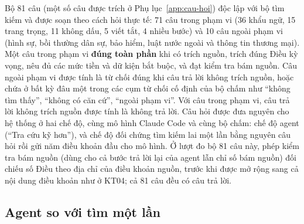 Bộ 81 câu (một số câu được trích ở Phụ lục~\ref{app:cau-hoi}) độc lập với bộ tìm kiếm và được soạn theo cách hỏi thực tế: 71 câu trong phạm vi (36 khẩu ngữ, 15 trang trọng, 11 không dấu, 5 viết tắt, 4 nhiều bước) và 10 câu ngoài phạm vi (hình sự, bồi thường dân sự, bảo hiểm, luật nước ngoài và thông tin thương mại). Một câu trong phạm vi \textbf{đúng toàn phần} khi có trích nguồn, trích đúng Điều kỳ vọng, nêu đủ các mức tiền và dữ kiện bắt buộc, và đạt kiểm tra bám nguồn. Câu ngoài phạm vi được tính là từ chối đúng khi câu trả lời không trích nguồn, hoặc chứa ở bất kỳ đâu một trong các cụm từ chối cố định của bộ chấm như ``không tìm thấy'', ``không có căn cứ'', ``ngoài phạm vi''. Với câu trong phạm vi, câu trả lời không trích nguồn được tính là không trả lời. Câu hỏi được đưa nguyên cho hệ thống ở hai chế độ, cùng mô hình Claude Code và cùng bộ chấm: chế độ agent (``Tra cứu kỹ hơn''), và chế độ đối chứng tìm kiếm lai một lần bằng nguyên câu hỏi rồi gửi năm điều khoản đầu cho mô hình. Ở lượt đo bộ 81 câu này, phép kiểm tra bám nguồn (dùng cho cả bước trả lời lại của agent lẫn chỉ số bám nguồn) đối chiếu số Điều theo địa chỉ của điều khoản nguồn, trước khi được mở rộng sang cả nội dung điều khoản như ở KT04; cả 81 câu đều có câu trả lời.

\subsection{Agent so với tìm một lần}

